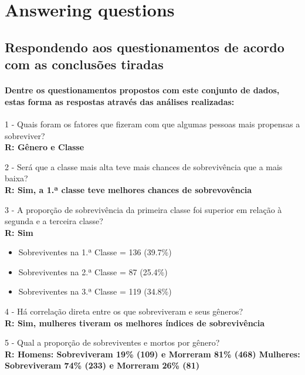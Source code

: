 \documentclass[11pt]{article}
\providecommand{\tightlist}{%
      \setlength{\itemsep}{0pt}\setlength{\parskip}{0pt}}
\begin{document}
\section{Answering questions}\label{answering-questions}

\subsection{Respondendo aos questionamentos de acordo com as conclusões
tiradas}\label{respondendo-aos-questionamentos-de-acordo-com-as-conclusuxf5es-tiradas}

\paragraph{Dentre os questionamentos propostos com este conjunto de
dados, estas forma as respostas através das análises
realizadas:}\label{dentre-os-questionamentos-propostos-com-este-conjunto-de-dados-estas-forma-as-respostas-atravuxe9s-das-anuxe1lises-realizadas}

1 - Quais foram os fatores que fizeram com que algumas pessoas mais
propensas a sobreviver?\\
\textbf{R: Gênero e Classe}

2 - Será que a classe mais alta teve mais chances de sobrevivência que a
mais baixa?\\
\textbf{R: Sim, a 1.ª classe teve melhores chances de sobrevovência }

3 - A proporção de sobrevivência da primeira classe foi superior em
relação à segunda e a terceira classe?\\
\textbf{R: Sim }

\begin{itemize}
\tightlist
\item
  Sobreviventes na 1.ª Classe = 136 (39.7\%)
\item
  Sobreviventes na 2.ª Classe = 87 (25.4\%)
\item
  Sobreviventes na 3.ª Classe = 119 (34.8\%)
\end{itemize}

4 - Há correlação direta entre os que sobreviveram e seus gêneros?\\
\textbf{R: Sim, mulheres tiveram os melhores índices de sobrevivência}

5 - Qual a proporção de sobreviventes e mortos por gênero?\\
\textbf{R: Homens: Sobreviveram 19\% (109) e Morreram 81\% (468)
\textbar{} Mulheres: Sobreviveram 74\% (233) e Morreram 26\% (81) }
\end{document}

